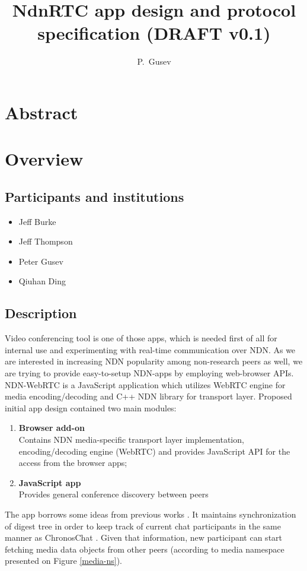 \documentclass[12pt]{article}
\author{P.~Gusev}
\title{NdnRTC app design and protocol specification (DRAFT v0.1)}
\begin{document}
\maketitle
\newpage

\section*{Abstract}
\tableofcontents

\newpage
\section{Overview}
\subsection{Participants and institutions}
\begin{itemize}
\item Jeff Burke
\item Jeff Thompson
\item Peter Gusev
\item Qiuhan Ding
\end{itemize}

\subsection{Description}
Video conferencing tool is one of those apps, which is needed first of all for internal use and experimenting with real-time communication over NDN. As we are interested in increasing NDN popularity among non-research peers as well, we are trying to provide easy-to-setup NDN-apps by employing web-browser APIs. NDN-WebRTC is a JavaScript application which utilizes WebRTC engine for media encoding/decoding and C++ NDN library for transport layer. Proposed initial app design contained two main modules: 
\begin{enumerate}
\item \textbf{Browser add-on} \\
Contains NDN media-specific transport layer implementation, encoding/decoding engine (WebRTC) and provides JavaScript API for the access from the browser apps;
\item \textbf{JavaScript app} \\
Provides general conference discovery between peers
\end{enumerate}

The app borrows some ideas from previous works \cite{videoTR,ChronosTR}. It maintains synchronization of digest tree in order to keep track of current chat participants in the same manner as ChronosChat \cite{ChronosTR}. Given that information, new participant can start fetching media data objects from other peers (according to media namespace presented on Figure \ref{media-ns}).
\end{document}
